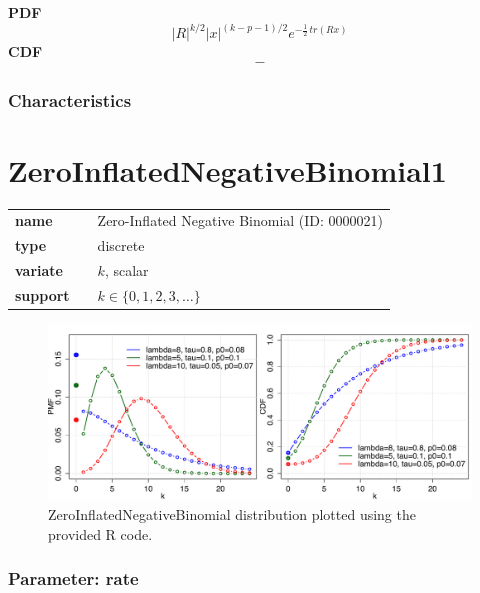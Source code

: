 \smallskip \noindent \hspace{.2cm} \textbf{PDF} 
\begin{equation*}|R|^{k/2}|x|^{(k-p-1)/2}e^{-\frac{1}2\,tr(Rx)}\end{equation*}
\smallskip \noindent \hspace{.2cm} \textbf{CDF} 
\begin{equation*}-\end{equation*}
\smallskip
\subsubsection*{Characteristics}
\smallskip
\section*{ZeroInflatedNegativeBinomial1} 

  \bigskip 

\begin{tabular}{p{2cm}cl}
\textbf{name} & & Zero-Inflated Negative Binomial (ID: 0000021)\\ 
 
\textbf{type} & & discrete \\ 

\textbf{variate} & & $k$, scalar \\ 

\textbf{support} & & $k \in \{0,1,2,3,\dots\}$
\end{tabular}

\begin{figure}[ht!]
\centering
  \includegraphics[width=140mm]{pics/ZeroInflatedNegativeBinomial.pdf}
 \caption{ZeroInflatedNegativeBinomial distribution plotted using the provided R code.}
 \label{fig:ZeroInflatedNegativeBinomial}
\end{figure}

\subsubsection*{Parameter: rate}


